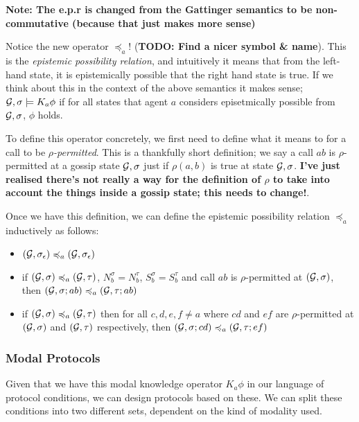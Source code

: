 \documentclass[12pt, a4paper]{article} %
\begin{document}
\textbf{Note: The e.p.r is changed from the Gattinger semantics to be non-commutative (because that just makes more sense)}

Notice the new operator $\preccurlyeq_a$! (\textbf{TODO: Find a nicer symbol \& name}). This is the \textit{epistemic possibility relation}, and intuitively it means that from the left-hand state, it is epistemically possible that the right hand state is true. If we think about this in the context of the above semantics it makes sense; $\mathcal{G}, \sigma \models K_a \phi$ if for all states that agent $a$ considers episetmically possible from $\mathcal{G}, \sigma$, $\phi$ holds.

To define this operator concretely, we first need to define what it means to for a call to be \textit{$\rho$-permitted}. This is a thankfully short definition; we say a call $ab$ is $\rho$-permitted at a gossip state $\mathcal{G}, \sigma$ just if $\rho(a, b)$ is true at state $\mathcal{G}, \sigma$. \textbf{I've just realised there's not really a way for the definition of $\rho$ to take into account the things inside a gossip state; this needs to change!}.

Once we have this definition, we can define the epistemic possibility relation $\preccurlyeq_a$ inductively as follows:

\begin{itemize}
    \item $(\mathcal{G}, \sigma_\epsilon) \preccurlyeq_a (\mathcal{G}, \sigma_\epsilon)$
    \item if $(\mathcal{G}, \sigma) \preccurlyeq_a (\mathcal{G}, \tau)$, $N_b^\sigma = N_b^\tau$, $S_b^\sigma = S_b^\tau$ and call $ab$ is $\rho$-permitted at $(\mathcal{G}, \sigma)$, then $(\mathcal{G}, \sigma; ab) \preccurlyeq_a (\mathcal{G}, \tau; ab)$
    \item if $(\mathcal{G}, \sigma) \preccurlyeq_a (\mathcal{G}, \tau)$ then for all $c, d, e, f \not = a$ where $cd$ and $ef$ are $\rho$-permitted at $(\mathcal{G}, \sigma)$ and $(\mathcal{G}, \tau)$ respectively, then $(\mathcal{G}, \sigma;cd) \preccurlyeq_a (\mathcal{G}, \tau;ef)$
\end{itemize} 

\subsubsection{Modal Protocols}
\label{subsubsec:modalprotocols}

Given that we have this modal knowledge operator $K_a \phi$ in our language of protocol conditions, we can design protocols based on these. We can split these conditions into two different sets, dependent on the kind of modality used.
\end{document}
